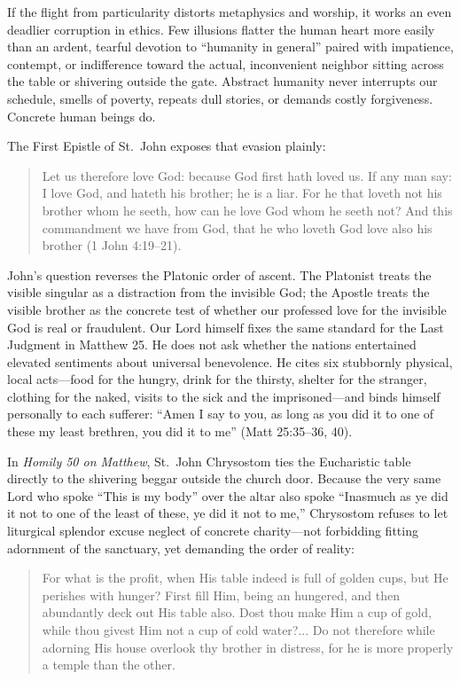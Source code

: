 If the flight from particularity distorts metaphysics and worship, it works an even deadlier corruption in ethics. Few illusions flatter the human heart more easily than an ardent, tearful devotion to ``humanity in general'' paired with impatience, contempt, or indifference toward the actual, inconvenient neighbor sitting across the table or shivering outside the gate. Abstract humanity never interrupts our schedule, smells of poverty, repeats dull stories, or demands costly forgiveness. Concrete human beings do.

The First Epistle of St.\ John exposes that evasion plainly:

\begin{quote}
Let us therefore love God: because God first hath loved us. If any man say: I love God, and hateth his brother; he is a liar. For he that loveth not his brother whom he seeth, how can he love God whom he seeth not? And this commandment we have from God, that he who loveth God love also his brother (1 John 4:19--21).
\end{quote}

John's question reverses the Platonic order of ascent. The Platonist treats the visible singular as a distraction from the invisible God; the Apostle treats the visible brother as the concrete test of whether our professed love for the invisible God is real or fraudulent. Our Lord himself fixes the same standard for the Last Judgment in Matthew 25. He does not ask whether the nations entertained elevated sentiments about universal benevolence. He cites six stubbornly physical, local acts---food for the hungry, drink for the thirsty, shelter for the stranger, clothing for the naked, visits to the sick and the imprisoned---and binds himself personally to each sufferer: ``Amen I say to you, as long as you did it to one of these my least brethren, you did it to me'' (Matt 25:35--36, 40).

In \textit{Homily 50 on Matthew}, St.\ John Chrysostom ties the Eucharistic table directly to the shivering beggar outside the church door. Because the very same Lord who spoke ``This is my body'' over the altar also spoke ``Inasmuch as ye did it not to one of the least of these, ye did it not to me,'' Chrysostom refuses to let liturgical splendor excuse neglect of concrete charity---not forbidding fitting adornment of the sanctuary, yet demanding the order of reality:

\begin{quote}
For what is the profit, when His table indeed is full of golden cups, but He perishes with hunger? First fill Him, being an hungered, and then abundantly deck out His table also. Dost thou make Him a cup of gold, while thou givest Him not a cup of cold water?... Do not therefore while adorning His house overlook thy brother in distress, for he is more properly a temple than the other.
\end{quote}
